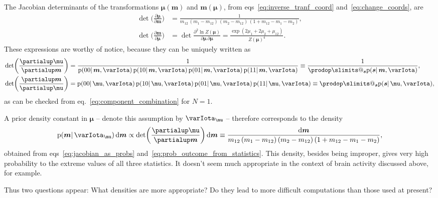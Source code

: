 \documentclass[\ifafour a4paper,12pt,\else a5paper,10pt,\fi%
onecolumn,oneside,article,%
british%
]{memoir}
\makeatletter
\theoremstyle{remark}
\theoremstyle{innote}
\def\prod{\DOTSI\prodop\slimits@}
\newcommand*{\de}{\partialup}%
\newcommand*{\di}{\mathrm{d}}%
\newcommand*{\pf}{\mathrm{p}}%
\renewcommand*{\|}{\mathpunct{|}}
\newcommand*{\eqn}{eq.}%
\newcommand*{\eqns}{eqs}%
\newcommand*{\yI}{\varIota}
\newcommand*{\ys}{\bm{s}}
\newcommand*{\la}{\mu_{12}}
\newcommand*{\yth}{\bm{\mu}}
\newcommand*{\yt}{\bm{m}}
\newcommand*{\yl}{m_{12}}
\newcommand*{\yIth}{\yI_{\yth}}
\makeatother
\begin{document}
The Jacobian determinants of the transformations $\yth(\yt)$ and $\yt(\yth)$, from
\eqns~\eqref{eq:inverse_tranf_coord} and~\eqref{eq:change_coords}, are
\begin{subequations}  \label{eq:jacobian_transf}
  \begin{align}
    \det\biggl( \frac{\de\yth}{\de\yt}\biggr)
    &= \frac{1}{\yl\,(m_1-\yl)\,(m_2-\yl)\,(1+\yl-m_1-m_2)},
    \\
    \det\biggl( \frac{\de\yt}{\de\yth}\biggr)
    &=
\det\frac{\de^2\ln Z(\yth)}{\de\yth\,\de\yth}
=
      \frac{\exp(2\mu_1 + 2\mu_2 + \la)}{Z(\yth)^4}.
  \end{align}
\end{subequations}
These expressions are worthy of notice, because they can be uniquely written
as
\begin{subequations}    \label{eq:jacobian_as_probs}
  \begin{align}
    \det\biggl( \frac{\de\yth}{\de\yt}\biggr)
    &=\frac{1}{
      \pf(00 \|\yt,\yI)\,
      \pf(10 \|\yt,\yI)\,
      \pf(01 \|\yt,\yI)\,
      \pf(11 \|\yt,\yI)}
      \equiv \frac{1}{\prod_{\ys}\pf(\ys \|\yt,\yI)},
      \\
      \det\biggl( \frac{\de\yt}{\de\yth}\biggr)
    &=
      \pf(00 \|\yth,\yI)\,
      \pf(10 \|\yth,\yI)\,
      \pf(01 \|\yth,\yI)\,
      \pf(11 \|\yth,\yI)
      \equiv \prod_{\ys}\pf(\ys \|\yth,\yI),
  \end{align}
\end{subequations}
as can be checked from \eqn~\eqref{eq:component_combination} for $N=1$.

A prior density constant in $\yth$ -- denote this assumption by $\yIth$ --
therefore corresponds to the density
\begin{equation}
  \label{eq:flat_density_in_statistics_space}
  \pf(\yt \|\yIth)\,\di\yt \propto
  \det\biggl( \frac{\de\yth}{\de\yt}\biggr)\,\di\yt
  \equiv
  \frac{\di\yt}{\yl\,(m_1-\yl)\,(m_2-\yl)\,(1+\yl-m_1-m_2)},
\end{equation}
obtained from \eqns~\eqref{eq:jacobian_as_probs}
and~\eqref{eq:prob_outcome_from_statistics}. This density, besides being
improper, gives very high probability to the extreme values of all three
statistics. It doesn't seem much appropriate in the context of brain
activity discussed above, for example.

Thus two questions appear: What densities are more appropriate? Do they
lead to more difficult computations than those used at present?
\end{document}
